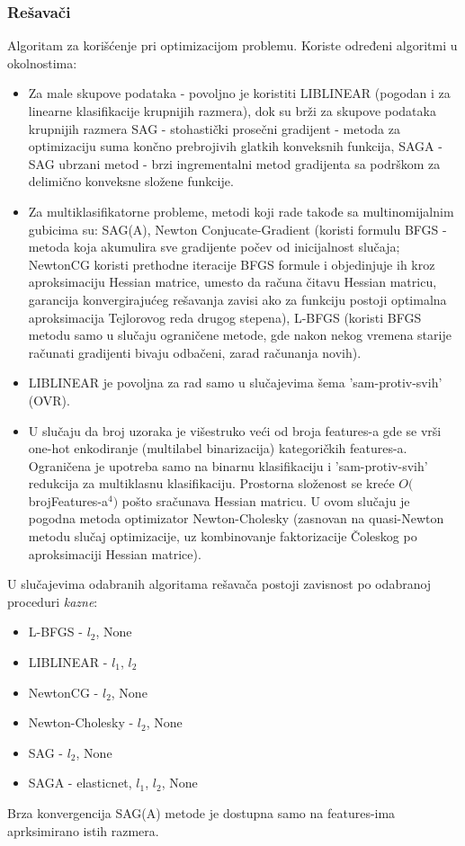 \documentclass[fontsize=12bp, paper=a4]{scrarticle}
\begin{document}
\subsubsection{Rešavači}
Algoritam za korišćenje pri optimizacijom problemu.\cite{lrsolvers} Koriste određeni algoritmi u okolnostima:
\begin{itemize}
    \item Za male skupove podataka - povoljno je koristiti LIBLINEAR (pogodan i za linearne klasifikacije krupnijih razmera\cite{liblinear}), dok su brži za skupove podataka krupnijih razmera SAG - stohastički prosečni gradijent - metoda za optimizaciju suma končno prebrojivih glatkih konveksnih funkcija\cite{sag}, SAGA - SAG ubrzani metod - brzi ingrementalni metod gradijenta sa podrškom za delimično konveksne složene funkcije\cite{saga}.
    \item Za multiklasifikatorne probleme, metodi koji rade takođe sa multinomijalnim gubicima su: SAG(A), Newton Conjucate-Gradient (koristi formulu BFGS - metoda koja akumulira sve gradijente počev od inicijalnost slučaja; NewtonCG koristi prethodne iteracije BFGS formule i objedinjuje ih kroz aproksimaciju Hessian matrice, umesto da računa čitavu Hessian matricu, garancija konvergirajućeg rešavanja zavisi ako za funkciju postoji optimalna aproksimacija Tejlorovog reda drugog stepena\cite{bfgs}), L-BFGS (koristi BFGS metodu samo u slučaju ograničene metode, gde nakon nekog vremena starije računati gradijenti bivaju odbačeni, zarad računanja novih).
    \item LIBLINEAR je povoljna za rad samo u slučajevima šema 'sam-protiv-svih' (OVR).
    \item U slučaju da broj uzoraka je višestruko veći od broja features-a gde se vrši one-hot enkodiranje (multilabel binarizacija) kategoričkih features-a. Ograničena je upotreba samo na binarnu klasifikaciju i 'sam-protiv-svih' redukcija za multiklasnu klasifikaciju. Prostorna složenost se kreće $O($brojFeatures-a$^4)$ pošto sračunava Hessian matricu. U ovom slučaju je pogodna metoda optimizator Newton-Cholesky (zasnovan na quasi-Newton metodu slučaj optimizacije, uz kombinovanje faktorizacije Čoleskog po aproksimaciji Hessian matrice)\cite{nc}.
\end{itemize}

U slučajevima odabranih algoritama rešavača postoji zavisnost po odabranoj proceduri \textit{kazne}:
\begin{itemize}
    \item L-BFGS - $l_2$, None
    \item LIBLINEAR - $l_1$, $l_2$
    \item NewtonCG - $l_2$, None
    \item Newton-Cholesky - $l_2$, None
    \item SAG - $l_2$, None
    \item SAGA - elasticnet, $l_1$, $l_2$, None
\end{itemize}
Brza konvergencija SAG(A) metode je dostupna samo na features-ima aprksimirano istih razmera.
\newpage
\end{document}

